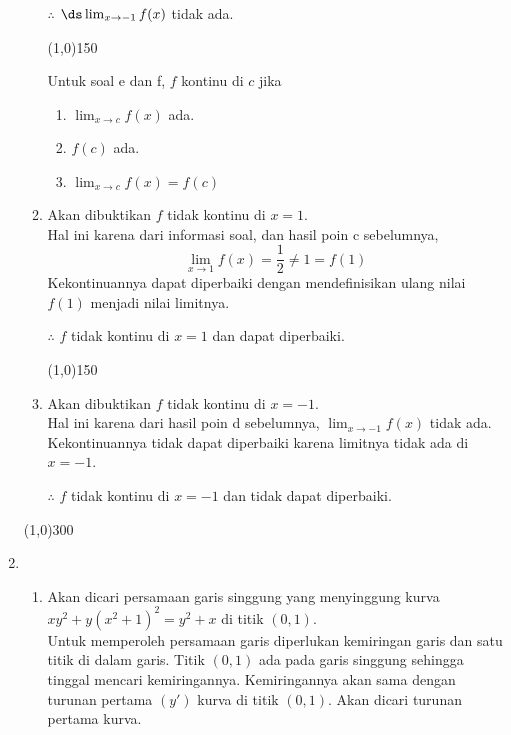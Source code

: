\begin{enumerate}[leftmargin=*, label={\arabic*}.]
\begin{enumerate}[label={\alph*}.]
    $\therefore$ $\ds \lim_{x \to -1} f(x)$ tidak ada. 
\begin{center}
\line(1,0){150}
\end{center}    
    Untuk soal e dan f, $f$ kontinu di $c$ jika
    \begin{enumerate}[label={\arabic*}.]
        \item $\lim_{x\to c} f(x)$ ada.
        \item $f(c)$ ada.
        \item $\lim_{x\to c} f(x) = f(c)$
    \end{enumerate}
    \item Akan dibuktikan $f$ tidak kontinu di $x = 1$.\\
    Hal ini karena dari informasi soal, dan hasil poin c sebelumnya,
    \[
        \lim_{x\to 1} f(x) = \frac{1}{2} \neq 1 = f(1)
    \]
    Kekontinuannya dapat diperbaiki dengan mendefinisikan ulang nilai $f(1)$ 
    menjadi nilai limitnya.

    $\therefore$ $f$ tidak kontinu di $x=1$ dan dapat diperbaiki.
\begin{center}
\line(1,0){150}
\end{center} 
    \item Akan dibuktikan $f$ tidak kontinu di $x = -1$.\\
    Hal ini karena dari hasil poin d sebelumnya, $\lim_{x\to -1} f(x)$ 
    tidak ada.
    Kekontinuannya tidak dapat diperbaiki karena limitnya tidak ada di $x=-1$.

    $\therefore$ $f$ tidak kontinu di $x=-1$ dan tidak dapat diperbaiki.
\end{enumerate}
\begin{center}
    \line(1,0){300}
\end{center}
\item 
\begin{enumerate}[label={\alph*}.]
    \item Akan dicari persamaan garis singgung yang menyinggung kurva \\
    $xy^{2}+y(x^{2}+1)^{2} = y^{2}+x$ di titik $(0,1)$.\\
    Untuk memperoleh persamaan garis diperlukan kemiringan garis dan satu titik
    di dalam garis. Titik $(0,1)$ ada pada garis singgung sehingga tinggal mencari 
    kemiringannya. Kemiringannya akan sama dengan turunan pertama $(y')$ kurva di titik 
    $(0,1)$. Akan dicari turunan pertama kurva.


\end{enumerate}
\end{enumerate}
